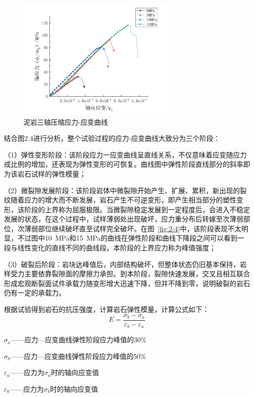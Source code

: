 \begin{figure}[ht!]
    \centering
    \includegraphics[width=0.7\textwidth]{img/chap2/2-4.png}
    \caption{泥岩三轴压缩应力-应变曲线}
    \label{fig:2-5}
\end{figure}

结合图2.4进行分析，整个试验过程的应力-应变曲线大致分为三个阶段：

（1）弹性变形阶段：该阶段应力一应变曲线呈直线关系，不仅意味着应变随应力成比例的增加，还表现为弹性变形的可恢复。曲线图中弹性阶段直线部分的斜率即为该岩石试样的弹性模量；

（2）微裂隙发展阶段：该阶段岩体中微裂隙开始产生、扩展、累积，新出现的裂纹随着应力的增大而不断发展，岩石产生不可逆变形，即产生相当部分的塑性变形，该阶段的上界称为屈服极限。当微裂隙稳定发展到一定程度后，会进入不稳定发展的状态，在这个过程中，试样薄弱处出现破坏，应力重分布后转嫁至次薄弱部位，次薄弱部位继续破坏直至试样完全破坏。在图~\ref{fig:2-4}中，该阶段表现不太明显，不过图中\SI{10}{MPa}和\SI{15}{MPa}的曲线在弹性阶段和曲线下降段之间可以看到一段与线性变化的直线不同的曲线段。本阶段的上界应力称为峰值强度；

（3）破裂后阶段：岩块达峰值后，内部结构破坏，但整体状态仍旧基本保持，岩样受力主要依靠裂隙面的摩擦力承担。到本阶段，裂隙快速发展，交叉且相互联合形成宏观断裂面试件承载力随变形增大迅速下降，但并不降到零，说明破裂的岩石仍有一定的承载力。

根据试验得到岩石的抗压强度，计算岩石弹性模量，计算公式如下：
\begin{equation}
    E=\frac{\sigma_b-\sigma_a}{\varepsilon_b-\varepsilon_a}
\end{equation}
\begin{shizhong}
     \item $\sigma_a$——应力—应变曲线弹性阶段应力峰值的30\%
     \item $\sigma_b$——应力—应变曲线弹性阶段应力峰值的50\%
     \item $\varepsilon_a$——应力为$\sigma_a$时的轴向应变值     
     \item $\varepsilon_b$——应力为$\sigma_b$时的轴向应变值
\end{shizhong}
 
